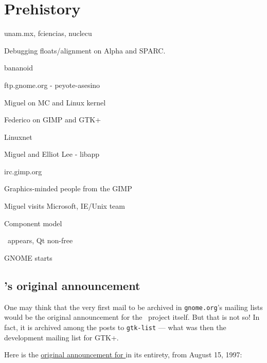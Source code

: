 \chapter{Prehistory}


unam.mx, fciencias, nuclecu

Debugging floats/alignment on Alpha and SPARC.

bananoid

ftp.gnome.org - peyote-asesino

Miguel on MC and Linux kernel

Federico on GIMP and GTK+

Linuxnet

Miguel and Elliot Lee - libapp

irc.gimp.org

Graphics-minded people from the GIMP

Miguel visits Microsoft, IE/Unix team

Component model

\KDE\ appears, Qt non-free

GNOME starts

\section{\GNOME's original announcement}

One may think that the very first mail to be archived in {\tt gnome.org}'s mailing
lists would be the original announcement for the \GNOME\ project
itself.  But that is not so!  In fact, it is archived among the posts
to {\tt gtk-list} --- what was then the development mailing list for
GTK+.

Here is the
\href{https://mail.gnome.org/archives/gtk-list/1997-August/msg00123.html}{original
  announcement for \GNOME} in its entirety, from August
15, 1997:\cite{original-gnome-announcement}

